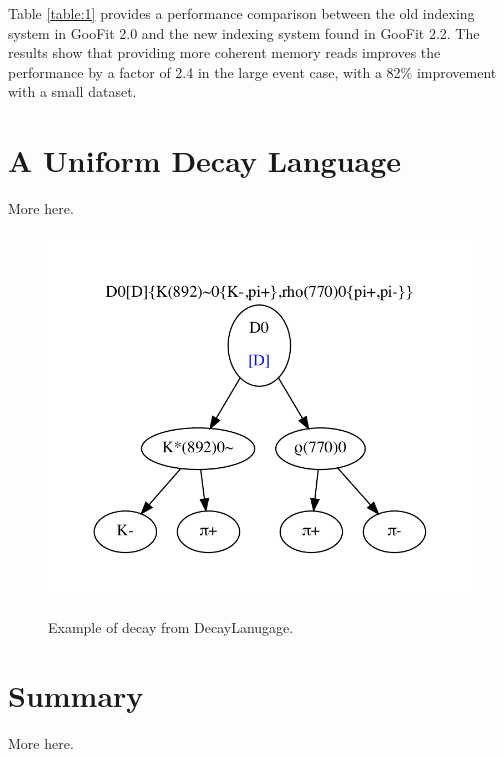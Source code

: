 \documentclass{webofc}
\begin{document}
Table \ref{table:1} provides a performance comparison between the old indexing system in GooFit 2.0 and the new indexing system found in GooFit 2.2. The results show that providing more coherent memory reads improves the performance by a factor of 2.4 in the large event case, with a 82\% improvement with a small dataset.

\section{A Uniform Decay Language}
\label{sec-ampgen}
More here.

\begin{figure}
	\includegraphics[width=.5\textwidth]{LineExample}
	\label{figure-ampgen}
	\caption{Example of decay from DecayLanugage.}
\end{figure}

\section{Summary}
\label{sec-summary}
More here.


%
\end{document}
